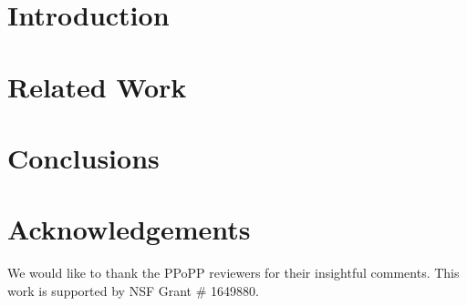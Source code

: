 \documentclass[sigplan,10pt]{acmart}\settopmatter{printfolios=true,printccs=false,printacmref=false}
\begin{document}


\maketitle

\section{Introduction}


\vspace{-10pt}
\section{Related Work}






\section{Conclusions}


\section{Acknowledgements}

We would like to thank the PPoPP reviewers for their insightful comments.
This work is supported by NSF Grant \# 1649880.

{\footnotesize 
}


%
\end{document}

